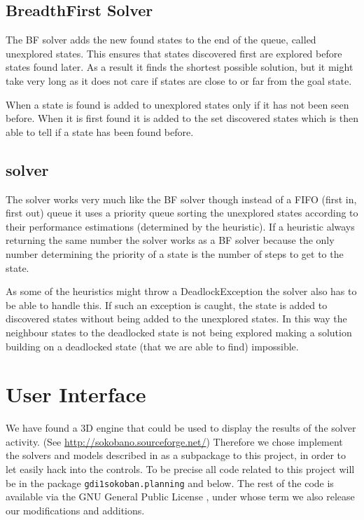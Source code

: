 \subsection{BreadthFirst Solver}
The BF solver adds the new found states to the end of the queue,
called unexplored states. This ensures that states discovered first
are explored before states found later. As a result it finds the
shortest possible solution, but it might take very long as it does not
care if states are close to or far from the goal state.

When a state is found is added to unexplored states only if it has not
been seen before. When it is first found it is added to the set
discovered states which is then able to tell if a state has been found
before.

\subsection{\astar solver}
The \astar solver works very much like the BF solver though instead of
a FIFO (first in, first out) queue it uses a priority queue sorting
the unexplored states according to their performance estimations
(determined by the heuristic). If a heuristic always returning the
same number the solver works as a BF solver because the only number
determining the priority of a state is the number of steps to get to
the state.

As some of the heuristics might throw a DeadlockException the \astar
solver also has to be able to handle this. If such an exception is
caught, the state is added to discovered states without being added to
the unexplored states. In this way the neighbour states to the
deadlocked state is not being explored making a solution building on a
deadlocked state (that we are able to find) impossible.

\section{User Interface}
We have found a 3D engine that could be used to display the results of
the solver activity. (See \url{http://sokobano.sourceforge.net/})
Therefore we chose implement the solvers and models described in as a
subpackage to this project, in order to let easily hack into the
controls. To be precise all code related to this project will be in
the package \texttt{gdi1sokoban.planning} and below. The rest of the
code is available via the GNU General Public License \cite{gpl}, under
whose term we also release our modifications and additions.
